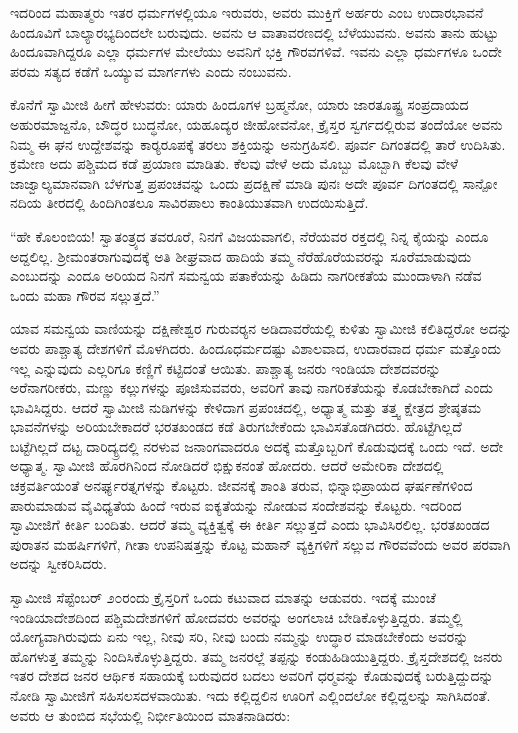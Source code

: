  ಇದರಿಂದ ಮಹಾತ್ಮರು ಇತರ ಧರ್ಮಗಳಲ್ಲಿಯೂ ಇರುವರು, ಅವರು ಮುಕ್ತಿಗೆ ಅರ್ಹರು ಎಂಬ ಉದಾರಭಾವನೆ ಹಿಂದೂವಿಗೆ ಬಾಲ್ಯಾರಭ್ಯದಿಂದಲೇ ಬರುವುದು. ಅವನು ಆ ವಾತಾವರಣದಲ್ಲಿ ಬೆಳೆಯುವನು. ಅವನು ತಾನು ಹುಟ್ಟು ಹಿಂದೂವಾಗಿದ್ದರೂ ಎಲ್ಲಾ ಧರ್ಮಗಳ ಮೇಲೆಯು ಅವನಿಗೆ ಭಕ್ತಿ ಗೌರವಗಳಿವೆ. ಇವನು ಎಲ್ಲಾ ಧರ್ಮಗಳೂ ಒಂದೇ ಪರಮ ಸತ್ಯದ ಕಡೆಗೆ ಒಯ್ಯುವ ಮಾರ್ಗಗಳು ಎಂದು ನಂಬುವನು. 

 ಕೊನೆಗೆ ಸ್ವಾಮೀಜಿ ಹೀಗೆ ಹೇಳುವರು: ಯಾರು ಹಿಂದೂಗಳ ಬ್ರಹ್ಮನೋ, ಯಾರು ಜಾರತೂಷ್ಟ್ರ ಸಂಪ್ರದಾಯದ ಅಹುರಮಾಜ್ದನೊ, ಬೌದ್ಧರ ಬುದ್ಧನೋ, ಯಹೂದ್ಯರ ಜೀಹೋವನೋ, ಕ್ರೈಸ್ತರ ಸ್ವರ್ಗದಲ್ಲಿರುವ ತಂದೆಯೋ ಅವನು ನಿಮ್ಮ ಈ ಘನ ಉದ್ದೇಶವನ್ನು ಕಾರ‍್ಯರೂಪಕ್ಕೆ ತರಲು ಶಕ್ತಿಯನ್ನು ಅನುಗ್ರಹಿಸಲಿ. ಪೂರ್ವ ದಿಗಂತದಲ್ಲಿ ತಾರೆ ಉದಿಸಿತು. ಕ್ರಮೇಣ ಅದು ಪಶ್ಚಿಮದ ಕಡೆ ಪ್ರಯಾಣ ಮಾಡಿತು. ಕೆಲವು ವೇಳೆ ಅದು ಮೊಬ್ಬು ಮೊಬ್ಬಾಗಿ ಕೆಲವು ವೇಳೆ ಜಾಜ್ವಾಲ್ಯಮಾನವಾಗಿ ಬೆಳಗುತ್ತ ಪ್ರಪಂಚವನ್ನು ಒಂದು ಪ್ರದಕ್ಷಿಣೆ ಮಾಡಿ ಪುನಃ ಅದೇ ಪೂರ್ವ ದಿಗಂತದಲ್ಲಿ ಸಾನ್ಪೋ ನದಿಯ ತೀರದಲ್ಲಿ ಹಿಂದಿಗಿಂತಲೂ ಸಾವಿರಪಾಲು ಕಾಂತಿಯುತವಾಗಿ ಉದಯಿಸುತ್ತಿದೆ. 

 “ಹೇ ಕೊಲಂಬಿಯ! ಸ್ವಾತಂತ್ರ್ಯದ ತವರೂರೆ, ನಿನಗೆ ವಿಜಯವಾಗಲಿ, ನೆರೆಯವರ ರಕ್ತದಲ್ಲಿ ನಿನ್ನ ಕೈಯನ್ನು ಎಂದೂ ಅದ್ದಲಿಲ್ಲ. ಶ‍್ರೀಮಂತರಾಗುವುದಕ್ಕೆ ಅತಿ ಶೀಘ್ರವಾದ ಹಾದಿಯೆ ತಮ್ಮ ನೆರೆಹೊರೆಯವರನ್ನು ಸೂರೆಮಾಡುವುದು ಎಂಬುದನ್ನು ಎಂದೂ ಅರಿಯದ ನಿನಗೆ ಸಮನ್ವಯ ಪತಾಕೆಯನ್ನು ಹಿಡಿದು ನಾಗರೀಕತೆಯ ಮುಂದಾಳಾಗಿ ನಡೆವ ಒಂದು ಮಹಾ ಗೌರವ ಸಲ್ಲುತ್ತದೆ.” 

 ಯಾವ ಸಮನ್ವಯ ವಾಣಿಯನ್ನು ದಕ್ಷಿಣೇಶ್ವರ ಗುರುವರ‍್ಯನ ಅಡಿದಾವರೆಯಲ್ಲಿ ಕುಳಿತು ಸ್ವಾಮೀಜಿ ಕಲಿತಿದ್ದರೋ ಅದನ್ನು ಅವರು ಪಾಶ್ಚಾತ್ಯ ದೇಶಗಳಿಗೆ ಮೊಳಗಿದರು. ಹಿಂದೂಧರ್ಮದಷ್ಟು ವಿಶಾಲವಾದ, ಉದಾರವಾದ ಧರ್ಮ ಮತ್ತೊಂದು ಇಲ್ಲ ಎನ್ನುವುದು ಎಲ್ಲರಿಗೂ ಕಣ್ಣಿಗೆ ಕಟ್ಟಿದಂತೆ ಆಯಿತು. ಪಾಶ್ಚಾತ್ಯ ಜನರು ಇಂಡಿಯಾ ದೇಶದವರನ್ನು ಅರೆನಾಗರೀಕರು, ಮಣ್ಣು ಕಲ್ಲುಗಳನ್ನು ಪೂಜಿಸುವವರು, ಅವರಿಗೆ ತಾವು ನಾಗರಿಕತೆಯನ್ನು ಕೊಡಬೇಕಾಗಿದೆ ಎಂದು ಭಾವಿಸಿದ್ದರು. ಆದರೆ ಸ್ವಾಮೀಜಿ ನುಡಿಗಳನ್ನು ಕೇಳಿದಾಗ ಪ್ರಪಂಚದಲ್ಲಿ, ಅಧ್ಯಾತ್ಮ ಮತ್ತು ತತ್ತ್ವ ಕ್ಷೇತ್ರದ ಶ್ರೇಷ್ಠತಮ ಭಾವನೆಗಳನ್ನು ಅರಿಯಬೇಕಾದರೆ ಭರತಖಂಡದ ಕಡೆ ತಿರುಗಬೇಕೆಂದು ಭಾವಿಸತೊಡಗಿದರು. ಹೊಟ್ಟೆಗಿಲ್ಲದೆ ಬಟ್ಟೆಗಿಲ್ಲದೆ ದಟ್ಟ ದಾರಿದ್ಯ್ರದಲ್ಲಿ ನರಳುವ ಜನಾಂಗವಾದರೂ ಅದಕ್ಕೆ ಮತ್ತೊಬ್ಬರಿಗೆ ಕೊಡುವುದಕ್ಕೆ ಒಂದು ಇದೆ. ಅದೇ ಅಧ್ಯಾತ್ಮ. ಸ್ವಾಮೀಜಿ ಹೊರಗಿನಿಂದ ನೋಡಿದರೆ ಭಿಕ್ಷುಕನಂತೆ ಹೋದರು. ಆದರೆ ಅಮೇರಿಕಾ ದೇಶದಲ್ಲಿ ಚಕ್ರವರ್ತಿಯಂತೆ ಅನರ್ಘ್ಯರತ್ನಗಳನ್ನು ಕೊಟ್ಟರು. ಜೀವನಕ್ಕೆ ಶಾಂತಿ ತರುವ, ಭಿನ್ನಾಭಿಪ್ರಾಯದ ಘರ್ಷಣೆಗಳಿಂದ ಪಾರುಮಾಡುವ ವೈವಿಧ್ಯತೆಯ ಹಿಂದೆ ಇರುವ ಐಕ್ಯತೆಯನ್ನು ನೋಡುವ ಸಂದೇಶವನ್ನು ಕೊಟ್ಟರು. ಇದರಿಂದ ಸ್ವಾಮೀಜಿಗೆ ಕೀರ್ತಿ ಬಂದಿತು. ಆದರೆ ತಮ್ಮ ವ್ಯಕ್ತಿತ್ವಕ್ಕೆ ಈ ಕೀರ್ತಿ ಸಲ್ಲುತ್ತದೆ ಎಂದು ಭಾವಿಸಿರಲಿಲ್ಲ. ಭರತಖಂಡದ ಪುರಾತನ ಮಹರ್ಷಿಗಳಿಗೆ, ಗೀತಾ ಉಪನಿಷತ್ತನ್ನು ಕೊಟ್ಟ ಮಹಾನ್ ವ್ಯಕ್ತಿಗಳಿಗೆ ಸಲ್ಲುವ ಗೌರವವೆಂದು ಅವರ ಪರವಾಗಿ ಅದನ್ನು ಸ್ವೀಕರಿಸಿದರು. 

 ಸ್ವಾಮೀಜಿ ಸೆಪ್ಟೆಂಬರ್ ೨೦ರಂದು ಕ್ರೈಸ್ತರಿಗೆ ಒಂದು ಕಟುವಾದ ಮಾತನ್ನು ಆಡುವರು. ಇದಕ್ಕೆ ಮುಂಚೆ ಇಂಡಿಯಾದೇಶದಿಂದ ಪಶ್ಚಿಮದೇಶಗಳಿಗೆ ಹೋದವರು ಅವರನ್ನು ಅಂಗಲಾಚಿ ಬೇಡಿಕೊಳ್ಳುತ್ತಿದ್ದರು. ತಮ್ಮಲ್ಲಿ ಯೋಗ್ಯವಾಗಿರುವುದು ಏನು ಇಲ್ಲ, ನೀವು ಸರಿ, ನೀವು ಬಂದು ನಮ್ಮನ್ನು ಉದ್ಧಾರ ಮಾಡಬೇಕೆಂದು ಅವರನ್ನು ಹೊಗಳುತ್ತ ತಮ್ಮನ್ನು ನಿಂದಿಸಿಕೊಳ್ಳುತ್ತಿದ್ದರು. ತಮ್ಮ ಜನರಲ್ಲೆ ತಪ್ಪನ್ನು ಕಂಡುಹಿಡಿಯುತ್ತಿದ್ದರು. ಕ್ರೈಸ್ತದೇಶದಲ್ಲಿ ಜನರು ಇತರ ದೇಶದ ಜನರ ಆರ್ಥಿಕ ಸಹಾಯಕ್ಕೆ ಬರುವುದರ ಬದಲು ಅವರಿಗೆ ಧರ‍್ಮವನ್ನು ಕೊಡುವುದಕ್ಕೆ ಬರುತ್ತಿದ್ದುದನ್ನು ನೋಡಿ ಸ್ವಾಮೀಜಿಗೆ ಸಹಿಸಲಸದಳವಾಯಿತು. ಇದು ಕಲ್ಲಿದ್ದಲಿನ ಊರಿಗೆ ಎಲ್ಲಿಂದಲೋ ಕಲ್ಲಿದ್ದಲನ್ನು ಸಾಗಿಸಿದಂತೆ. ಅವರು ಆ ತುಂಬಿದ ಸಭೆಯಲ್ಲಿ ನಿರ್ಭೀತಿಯಿಂದ ಮಾತನಾಡಿದರು: 

